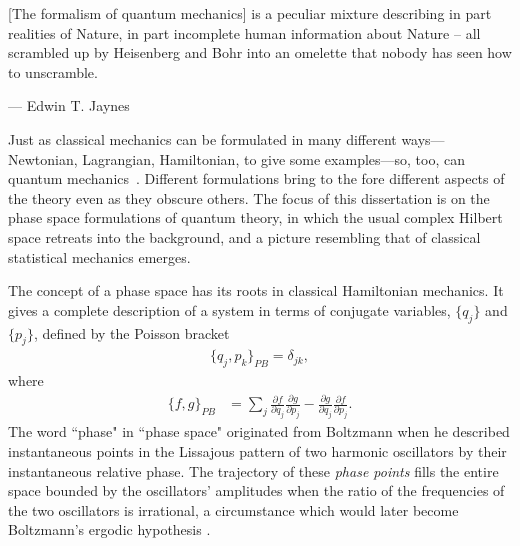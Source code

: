 \setlength\epigraphwidth{9cm}
\epigraph{[The formalism of quantum mechanics] is a peculiar mixture describing in part realities of Nature, in part incomplete human information about Nature -- all scrambled up by Heisenberg and Bohr into an omelette that nobody has seen how to unscramble.}{--- Edwin T. Jaynes}


Just as classical mechanics can be formulated in many different ways---Newtonian, Lagrangian, Hamiltonian, to give some examples---so, too, can quantum mechanics~\cite{styer2002nine}.  Different formulations bring to the fore different aspects of the theory even as they obscure others. The focus of this dissertation is on the phase space formulations of quantum theory, in which the usual complex Hilbert space retreats into the background, and a picture resembling that of classical statistical mechanics emerges.

The concept of a phase space has its roots in classical Hamiltonian mechanics. It gives a complete description of a system in terms of conjugate variables, $\{q_j\}$ and $\{p_j\}$, defined by the Poisson bracket
\begin{align}
\{ q_j,p_k \}_{PB} = \delta_{jk},
\end{align}
where
\begin{align}
	\{ f,g \}_{PB} &= \sum_j \frac{\partial f}{\partial q_j} \frac{\partial g}{\partial p_j} - \frac{\partial g}{\partial q_j} \frac{\partial f}{\partial p_j}.
\end{align}
The word ``phase" in ``phase space" originated from Boltzmann when he described instantaneous points in the Lissajous pattern of two harmonic oscillators by their instantaneous relative phase. The trajectory of these \emph{phase points} fills the entire space bounded by the oscillators' amplitudes when the ratio of the frequencies of the two oscillators is irrational, a circumstance which would later become Boltzmann's ergodic hypothesis \cite{nolte_tangled_2010}.

